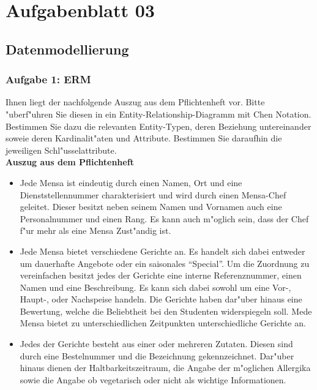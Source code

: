 
\chapter{Aufgabenblatt 03}


\section{Datenmodellierung}

\subsection{Aufgabe 1: ERM}

Ihnen liegt der nachfolgende Auszug aus dem Pflichtenheft vor. Bitte "uberf"uhren Sie diesen in ein Entity-Relationship-Diagramm mit Chen Notation.
Bestimmen Sie dazu die relevanten Entity-Typen, deren Beziehung untereinander soweie deren Kardinalit"aten und Attribute.
Bestimmen Sie daraufhin die jeweiligen Schl"usselattribute.\\

\noindent
\textbf{Auszug aus dem Pflichtenheft}
\begin{itemize}
    \item Jede Mensa ist eindeutig durch einen Namen, Ort und eine Dienststellennummer charakterisiert und wird durch einen Mensa-Chef geleitet.
    Dieser besitzt neben seinem Namen und Vornamen auch eine Personalnummer und einen Rang.
    Es kann auch m"oglich sein, dass der Chef f"ur mehr als eine Mensa Zust"andig ist.
    \item Jede Mensa bietet verschiedene Gerichte an.
    Es handelt sich dabei entweder um dauerhafte Angebote oder ein saisonales "`Special"'.
    Um die Zuordnung zu vereinfachen besitzt jedes der Gerichte eine interne Referenznummer, einen Namen und eine Beschreibung.
    Es kann sich dabei sowohl um eine Vor-, Haupt-, oder Nachspeise handeln.
    Die Gerichte haben dar"uber hinaus eine Bewertung, welche die Beliebtheit bei den Studenten widerspiegeln soll.
    Mede Mensa bietet zu unterschiedlichen Zeitpunkten unterschiedliche Gerichte an.
    \item Jedes der Gerichte besteht aus einer oder mehreren Zutaten.
    Diesen sind durch eine Bestelnummer und die Bezeichnung gekennzeichnet.
    Dar"uber hinaus dienen der Haltbarkeitszeitraum, die Angabe der m"oglichen Allergika sowie die Angabe ob vegetarisch oder nicht als wichtige Informationen.
\end{itemize}

